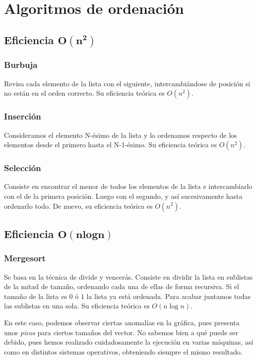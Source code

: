 \documentclass[11pt]{article}
\begin{document}
\section*{Algoritmos de ordenación}
\subsection*{Eficiencia $\boldsymbol{O(n^2)}$}
\subsubsection*{Burbuja}
Revisa cada elemento de la lista con el siguiente, intercambiándose de posición
si no están en el orden correcto. Su eficiencia teórica es $O(n^2)$.

\newpage
\subsubsection*{Inserción}
Consideramos el elemento N-ésimo de la lista y lo ordenamos respecto de los elementos desde el primero hasta el N-1-ésimo. Su eficiencia teórica es $O(n^2)$.

\subsubsection*{Selección}
Consiste en encontrar el menor de todos los elementos de la lista e intercambiarlo con el de la primera posición. Luego con el segundo, y así sucesivamente hasta ordenarlo todo. De nuevo, su eficiencia teórica es $O(n^2)$.


\subsection*{Eficiencia $\boldsymbol{O(n log n)}$}
\subsubsection*{Mergesort}
Se basa en la técnica de divide y vencerás. Consiste en dividir la lista en sublistas de la mitad de tamaño, ordenando cada una de ellas de forma recursiva. Si el tamaño de la lista es $0$ ó $1$ la lista ya está ordenada. Para acabar juntamos todas las sublistas en una sola. Su eficiencia teórica es $O(n\log n)$.


En este caso, podemos observar ciertas anomalías en la gráfica, pues presenta unos \textit{picos} para ciertos tamaños del vector. No sabemos bien a qué puede ser debido, pues hemos realizado cuidadosamente la ejecución en varias máquinas, así como en distintos sistemas operativos, obteniendo siempre el mismo resultado.
\end{document}
